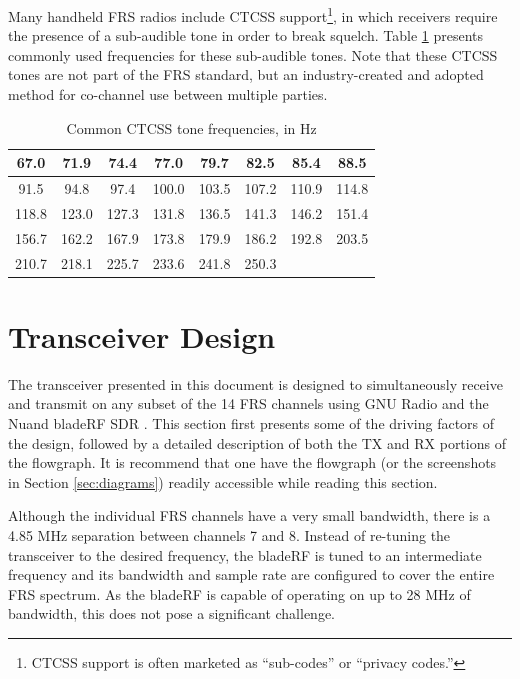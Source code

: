 Many handheld \ac{FRS} radios include \ac{CTCSS} support\footnote{CTCSS support
is often marketed as ``sub-codes'' or ``privacy codes.''}, in which receivers
require the presence of a sub-audible tone in order to break squelch. Table
\ref{tab:ctcss}  presents commonly used frequencies for these sub-audible tones.
Note that these CTCSS tones are not part of the FRS standard, but an
industry-created and adopted method for co-channel use between multiple
parties.

\begin{table}[h]
  \centering
  \caption{Common CTCSS tone frequencies, in Hz} \label{tab:ctcss}
  \footnotesize
  \begin{tabular}{|c|c|c|c|c|c|c|c|}
    \hline
    67.0  & 71.9  & 74.4  & 77.0  & 79.7  &  82.5 &  85.4 & 88.5  \\ \hline
    91.5  & 94.8  & 97.4  & 100.0 & 103.5 & 107.2 & 110.9 & 114.8 \\ \hline
    118.8 & 123.0 & 127.3 & 131.8 & 136.5 & 141.3 & 146.2 & 151.4 \\ \hline
    156.7 & 162.2 & 167.9 & 173.8 & 179.9 & 186.2 & 192.8 & 203.5 \\ \hline
    210.7 & 218.1 & 225.7 & 233.6 & 241.8 & 250.3 &       &       \\ \hline
  \end{tabular}
\end{table}

\cleardoublepage

\section{Transceiver Design} \label{sec:design}

The transceiver presented in this document is designed to simultaneously receive
and transmit on any subset of the 14 \ac{FRS} channels using GNU Radio
\cite{GNURADIO} and the Nuand bladeRF \ac{SDR} \cite{BLADERF}.  This section
first presents some of the driving factors of the design,
followed by a detailed description of both the \ac{TX} and \ac{RX} portions
of the flowgraph. It is recommend that one have the flowgraph (or the
screenshots in Section \ref{sec:diagrams})  readily accessible while reading
this section.

Although the individual \ac{FRS} channels have a very small bandwidth, there is
a 4.85 MHz separation between channels 7 and 8. Instead of re-tuning the
transceiver to the desired frequency, the bladeRF is tuned to an intermediate
frequency and its bandwidth and sample rate are configured to cover the entire
\ac{FRS} spectrum. As the bladeRF is capable of operating on up to 28 MHz of
bandwidth, this does not pose a significant challenge.

